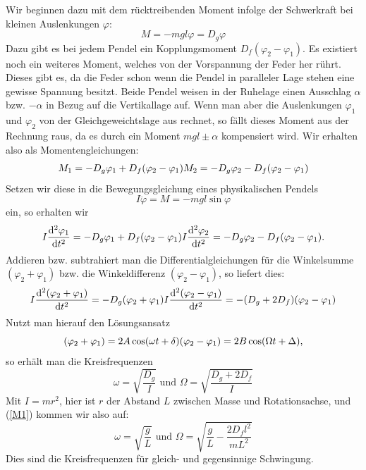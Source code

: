 \documentclass[11pt,a4paper]{article}
\newcommand\dif{\mathop{}\!\mathrm{d}}
\newcommand\vphi{\varphi}
\begin{document}
Wir beginnen dazu mit dem r\"ucktreibenden Moment infolge der Schwerkraft bei kleinen Auslenkungen $\vphi$:
\begin{equation}
M=-mgl\vphi=D_g\vphi\label{M1}
\end{equation}
Dazu gibt es bei jedem Pendel ein Kopplungsmoment $D_f(\vphi_2-\vphi_1)$. Es existiert noch ein weiteres Moment, welches von der Vorspannung der Feder her r\"uhrt. Dieses gibt es, da die Feder schon wenn die Pendel in paralleler Lage stehen eine gewisse Spannung besitzt. Beide Pendel weisen in der Ruhelage einen Ausschlag $\alpha$ bzw. $-\alpha$ in Bezug auf die Vertikallage auf. Wenn man aber die Auslenkungen $\vphi_1$ und $\vphi_2$ von der Gleichgeweichtslage aus rechnet, so f\"allt dieses Moment aus der Rechnung raus, da es durch ein Moment $mgl\pm\alpha$ kompensiert wird. Wir erhalten also als Momentengleichungen:
\begin{dmath}
{M_1=-D_g\vphi_1+D_f(\vphi_2-\vphi_1)}\\
{M_2=-D_g\vphi_2-D_f(\vphi_2-\vphi_1)}
\end{dmath}
Setzen wir diese in die Bewegungsgleichung eines physikalischen Pendels 
\[
I\ddot{\vphi}=M=-mgl\sin\vphi
\]
ein, so erhalten wir 
\begin{dmath}
{I\frac{\dif^2\vphi_1}{\dif t^2}=-D_g\vphi_1+D_f(\vphi_2-\vphi_1)}\\
{I\frac{\dif^2\vphi_2}{\dif t^2}=-D_g\vphi_2-D_f(\vphi_2-\vphi_1).}
\end{dmath}
Addieren bzw. subtrahiert man die Differentialgleichungen f\"ur die Winkelsumme $(\vphi_2+\vphi_1)$ bzw. die Winkeldifferenz $(\vphi_2-\vphi_1)$, so liefert dies:
\begin{dmath}
{I\frac{\dif^2(\vphi_2+\vphi_1)}{\dif t^2}=-D_g(\vphi_2+\vphi_1)}\\
{I\frac{\dif^2(\vphi_2-\vphi_1)}{\dif t^2}=-(D_g+2D_f)(\vphi_2-\vphi_1)}
\end{dmath}
Nutzt man hierauf den L\"osungsansatz
\begin{dmath}
{(\vphi_2+\vphi_1)=2A\cos(\omega t+\delta)}\\
{(\vphi_2-\vphi_1)=2B\cos(\Omega t+\Delta),}
\end{dmath}
so erh\"alt man die Kreisfrequenzen
\begin{equation}
\omega=\sqrt{\frac{D_g}{I}}\textrm{   und   }\Omega=\sqrt{\frac{D_g+2D_f}{I}}
\end{equation}
Mit $I=mr^2$, hier ist $r$ der Abstand $L$ zwischen Masse und Rotationsachse, und (\ref{M1}) kommen wir also auf:
\begin{equation}
\omega=\sqrt{\frac{g}{L}}\textrm{   und   }\Omega=\sqrt{\frac{g}{L}-\frac{2D_fl^2}{mL^2}}
\end{equation}
Dies sind die Kreisfrequenzen f\"ur gleich- und gegensinnige Schwingung.
\end{document}
